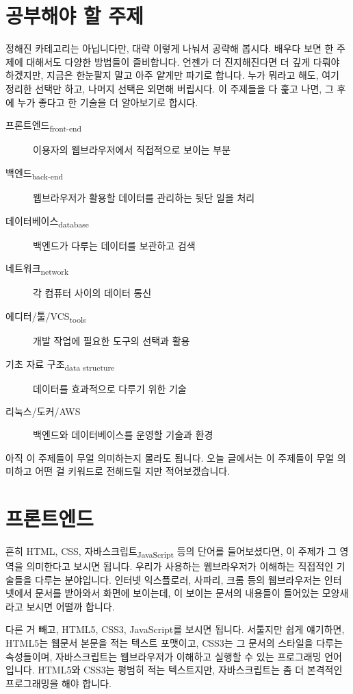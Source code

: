 \documentclass[11pt,a4paper]{article}
\newcommand{\sub}[1]{\textsubscript{#1}}
\begin{document}
\section{공부해야 할 주제}
정해진 카테고리는 아닙니다만, 대략 이렇게 나눠서 공략해 봅시다. 배우다 보면 한 주제에 대해서도 다양한 방법들이 즐비합니다.  언젠가 더 진지해진다면 더 깊게 다뤄야 하겠지만, 지금은 한눈팔지 말고 아주 얕게만 파기로 합니다. 누가 뭐라고 해도, 여기 정리한 선택만 하고, 나머지 선택은 외면해 버립시다. 이 주제들을 다 훑고 나면, 그 후에 누가 좋다고 한 기술을 더 알아보기로 합시다.

\begin{description}
\item[프론트엔드\sub{front-end}] 이용자의 웹브라우저에서 직접적으로 보이는 부분
\item[백엔드\sub{back-end}] 웹브라우저가 활용할 데이터를 관리하는 뒷단 일을 처리
\item[데이터베이스\sub{database}] 백엔드가 다루는 데이터를 보관하고 검색
\item[네트워크\sub{network}] 각 컴퓨터 사이의 데이터 통신
\item[에디터/툴/VCS\sub{tools}] 개발 작업에 필요한 도구의 선택과 활용
\item[기초 자료 구조\sub{data structure}] 데이터를 효과적으로 다루기 위한 기술
\item[리눅스/도커/AWS] 백엔드와 데이터베이스를 운영할 기술과 환경
\end{description}

아직 이 주제들이 무얼 의미하는지 몰라도 됩니다. 오늘 글에서는 이 주제들이 무얼 의미하고 어떤 걸 키워드로 전해드릴 지만 적어보겠습니다.

\section{프론트엔드}
흔히 \textsf{HTML, CSS, 자바스크립트\sub{JavaScript}} 등의 단어를 들어보셨다면, 이 주제가 그 영역을 의미한다고 보시면 됩니다. 우리가 사용하는 웹브라우저가 이해하는 직접적인 기술들을 다루는 분야입니다. 인터넷 익스플로러, 사파리, 크롬 등의 웹브라우저는 인터넷에서 문서를 받아와서 화면에 보이는데, 이 보이는 문서의 내용들이 들어있는 모양새라고 보시면 어떨까 합니다.

다른 거 빼고, \textsf{HTML5, CSS3, JavaScript}를 보시면 됩니다. 서툴지만 쉽게 얘기하면, \textsf{HTML5}는 웹문서 본문을 적는 텍스트 포맷이고, \textsf{CSS3}는 그 문서의 스타일을 다루는 속성들이며, \textsf{자바스크립트}는 웹브라우저가 이해하고 실행할 수 있는 프로그래밍 언어입니다. \textsf{HTML5}와 \textsf{CSS3}는 평범히 적는 텍스트지만, \textsf{자바스크립트}는 좀 더 본격적인 프로그래밍을 해야 합니다.
\end{document}
